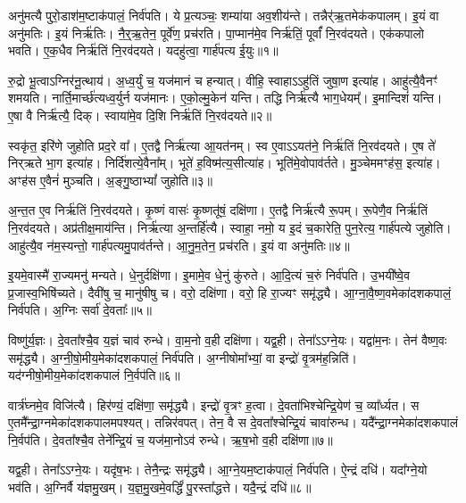 अनु॑मत्यै पुरो॒डाश॑म॒ष्टा\-क॑पालं॒ निर्व॑पति।
ये प्र॒त्यञ्चः॒ शम्या॑या अव॒शीय॑न्ते।
तन्नैर्॑ऋ॒तमेक॑कपालम्।
इ॒यं वा अनु॑मतिः।
इ॒यं निर्\mbox{}ऋ॑तिः।
नै॒र्॒ऋ॒तेन॒ पूर्वे॑ण॒ प्रच॑रति।
पा॒प्मान॑मे॒व निर्\mbox{}ऋ॑तिं॒ पूर्वां᳚ नि॒रव॑दयते।
एक॑कपालो भवति।
ए॒क॒धैव निर्\mbox{}ऋ॑तिं नि॒रव॑दयते।
यदहु॑त्वा॒ गार्\mbox{}ह॑पत्य ई॒युः॥१॥

रु॒द्रो भू॒त्वा\-ऽग्निर॑नू॒त्थाय॑।
अ॒ध्व॒र्युं च॒ यज॑मानं च हन्यात्।
वीहि॒ स्वाहा\-ऽऽहु॑तिं जुषा॒ण इत्या॑ह।
आहु॑त्यै॒वैनꣳ॑ शमयति।
नार्ति॒मार्च्छ॑त्यध्व॒र्युर्न यज॑मानः।
ए॒को॒ल्मु॒केन॑ यन्ति।
तद्धि निर्\mbox{}ऋ॑त्यै भाग॒धेयम्᳚।
इ॒मान्दिशं॑ यन्ति।
ए॒षा वै निर्\mbox{}ऋ॑त्यै॒ दिक्।
स्वाया॑मे॒व दि॒शि निर्\mbox{}ऋ॑तिं नि॒रव॑दयते॥२॥

स्वकृ॑त॒ इरि॑णे जुहोति प्रद॒रे वा᳚।
ए॒तद्वै निर्\mbox{}ऋ॑त्या आ॒यत॑नम्।
स्व ए॒वाऽऽयत॑ने॒ निर्\mbox{}ऋ॑तिं नि॒रव॑दयते।
ए॒ष ते॑ निर्‌\mbox{}ऋते भा॒ग इत्या॑ह।
निर्दि॑शत्ये॒वैना᳚म्।
भूते॑ ह॒विष्म॑त्य॒सीत्या॑ह।
भूति॑मे॒वोपाव॑र्तते।
मु॒ञ्चेममꣳह॑स॒ इत्या॑ह।
अꣳह॑स ए॒वैनं॑ मुञ्चति।
अ॒ङ्गु॒ष्ठाभ्यां᳚ जुहोति॥३॥

अ॒न्त॒त ए॒व निर्\mbox{}ऋ॑तिं नि॒रव॑दयते।
कृ॒ष्णं वासः॑ कृ॒ष्णतू॑षं॒ दक्षि॑णा।
ए॒तद्वै निर्\mbox{}ऋ॑त्यै रू॒पम्।
रू॒पेणै॒व निर्\mbox{}ऋ॑तिं नि॒रव॑दयते।
अप्र॑तीक्ष॒माय॑न्ति।
निर्\mbox{}ऋ॑त्या अ॒न्तर्\mbox{}हि॑त्यै।
स्वाहा॒ नमो॒ य इ॒दं च॒कारेति॒ पुन॒रेत्य॒ गार्\mbox{}ह॑पत्ये जुहोति।
आहु॑त्यै॒व न॑म॒स्यन्तो॒ गार्\mbox{}ह॑पत्यमु॒पाव॑र्तन्ते।
आ॒नु॒म॒तेन॒ प्रच॑रति।
इ॒यं वा अनु॑मतिः॥४॥

इ॒यमे॒वास्मै॑ रा॒ज्यमनु॑ मन्यते।
धे॒नुर्दक्षि॑णा।
इ॒मामे॒व धे॒नुं कु॑रुते।
आ॒दि॒त्यं च॒रुं निर्व॑पति।
उ॒भयी᳚ष्वे॒व प्र॒जास्व॒भिषि॑च्यते।
दैवी॑षु च॒ मानु॑षीषु च।
वरो॒ दक्षि॑णा।
वरो॒ हि रा॒ज्यꣳ समृ॑द्ध्यै।
आ॒ग्ना॒वै॒ष्ण॒वमेका॑\-दश\-कपालं॒ निर्व॑पति।
अ॒ग्निः सर्वा॑ दे॒वताः᳚॥५॥

विष्णु॑र्य॒ज्ञः।
दे॒वता᳚श्चै॒व य॒ज्ञं चाव॑ रुन्धे।
वा॒म॒नो व॒ही दक्षि॑णा।
यद्व॒ही।
तेना᳚ऽऽग्ने॒यः।
यद्वा॑म॒नः।
तेन॑ वैष्ण॒वः समृ॑द्ध्यै।
अ॒ग्नी॒षो॒मीय॒मेका॑\-दश\-कपालं॒ निर्व॑पति।
अ॒ग्नीषोमा᳚भ्यां॒ वा इन्द्रो॑ वृ॒त्रम॑ह॒न्निति॑।
यद॑ग्नीषो॒मीय॒मेका॑\-दश\-कपालं नि॒र्वप॑ति॥६॥

वार्त्र॑घ्नमे॒व विजि॑त्यै।
हिर॑ण्यं॒ दक्षि॑णा॒ समृ॑द्ध्यै।
इन्द्रो॑ वृ॒त्रꣳ ह॒त्वा।
दे॒वता॑भिश्चेन्द्रि॒येण॑ च॒ व्या᳚र्ध्यत।
स ए॒तमै᳚न्द्रा॒ग्नमेका॑\-दश\-कपालमपश्यत्।
तन्निर॑वपत्।
तेन॒ वै स दे॒वता᳚श्चेन्द्रि॒यं चावा॑रुन्ध।
यदै᳚न्द्रा॒ग्नमेका॑\-दश\-कपालं नि॒र्वप॑ति।
दे॒वता᳚श्चै॒व तेने᳚न्द्रि॒यं च॒ यज॑मा॒नो\-ऽव॑ रुन्धे।
ऋ॒ष॒भो व॒ही दक्षि॑णा॥७॥

यद्व॒ही।
तेना᳚ऽऽग्ने॒यः।
यदृ॑ष॒भः।
तेनै॒न्द्रः समृ॑द्ध्यै।
आ॒ग्ने॒यम॒ष्टा\-क॑पालं॒ निर्व॑पति।
ऐ॒न्द्रं दधि॑।
यदा᳚ग्ने॒यो भव॑ति।
अ॒ग्निर्वै य॑ज्ञमु॒खम्।
य॒ज्ञ॒\-मु॒खमे॒वर्द्धिं॑ पु॒रस्ता᳚द्धत्ते।
यदै॒न्द्रं दधि॑॥८॥

